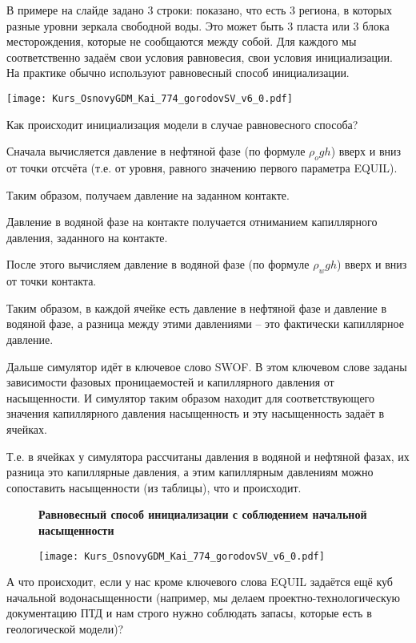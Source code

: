 В примере на слайде задано 3 строки: показано, что есть 3 региона, в которых разные уровни зеркала свободной воды.
Это может быть 3 пласта или 3 блока месторождения, которые не сообщаются между собой.
Для каждого мы соответственно задаём свои условия равновесия, свои условия инициализации.
\\

На практике обычно используют равновесный способ инициализации.

\texttt{[image: Kurs\_OsnovyGDM\_Kai\_774\_gorodovSV\_v6\_0.pdf]}

Как происходит инициализация модели в случае равновесного способа?

Сначала вычисляется давление в нефтяной фазе (по формуле $\rho_o gh$) вверх и вниз от точки отсчёта (т.е. от уровня, равного значению первого параметра EQUIL).

Таким образом, получаем давление на заданном контакте.

Давление в водяной фазе на контакте получается отниманием капиллярного давления, заданного на контакте.

После этого вычисляем давление в водяной фазе (по формуле $\rho_w gh$) вверх и вниз от точки контакта.

Таким образом, в каждой ячейке есть давление в нефтяной фазе и давление в водяной фазе, а разница между этими давлениями -- это фактически капиллярное давление.

Дальше симулятор идёт в ключевое слово SWOF.
В этом ключевом слове заданы зависимости фазовых проницаемостей и капиллярного давления от насыщенности.
И симулятор таким образом находит для соответствующего значения капиллярного давления насыщенность и эту насыщенность задаёт в ячейках.

Т.е. в ячейках у симулятора рассчитаны давления в водяной и нефтяной фазах, их разница это капиллярные давления, а этим капиллярным давлениям можно сопоставить насыщенности (из таблицы), что и происходит.
\\

\begin{figure}[H]
\textbf{Равновесный способ инициализации с соблюдением начальной насыщенности}

\texttt{[image: Kurs\_OsnovyGDM\_Kai\_774\_gorodovSV\_v6\_0.pdf]}
\end{figure}

А что происходит, если у нас кроме ключевого слова EQUIL задаётся ещё куб начальной водонасыщенности (например, мы делаем проектно-технологическую документацию ПТД и нам строго нужно соблюдать запасы, которые есть в геологической модели)?
\\

